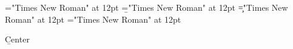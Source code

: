 \font\a="Times New Roman" at 12pt
\font\b="Times New Roman" at 12pt
\font\c="Times New Roman" at 12pt
\font\p="Times New Roman" at 12pt
\centerline{\b Center
}

\bye
